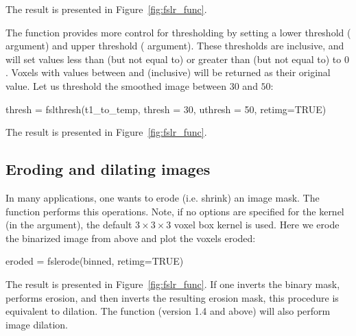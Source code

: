 The result is presented in Figure~\ref{fig:fslr_func}\protect{}.



The   function provides more control for thresholding by setting a lower threshold ( argument) and upper threshold ( argument).  These thresholds are inclusive, and will set values less than (but not equal to)  or greater than (but not equal to)  to $0$.  Voxels with values between  and  (inclusive) will be returned as their original value.  Let us threshold the smoothed image between $30$ and $50$:


\gobblepars
\begin{Schunk}
\begin{Sinput}
thresh = fslthresh(t1_to_temp, thresh = 30, uthresh = 50, retimg=TRUE)
\end{Sinput}
\end{Schunk}

The result is presented in Figure~\ref{fig:fslr_func}\protect{}.

\subsection{Eroding and dilating images}
In many applications, one wants to erode (i.e. shrink) an image mask.  The  function  performs this operations.  Note, if no options are specified for the kernel (in the  argument), the default $3\times3\times3$ voxel box kernel is used.  Here we erode the binarized image from above and plot the voxels eroded:




\begin{Schunk}
\begin{Sinput}
eroded = fslerode(binned, retimg=TRUE)
\end{Sinput}
\end{Schunk}

The result is presented in Figure~\ref{fig:fslr_func}\protect{}.  If one inverts the binary mask, performs erosion, and then inverts the resulting erosion mask, this procedure is equivalent to dilation.  The  function  (version 1.4 and above) will also perform image dilation.

